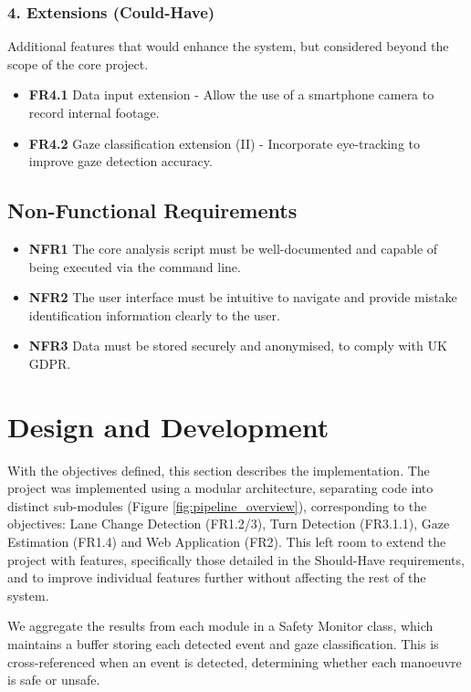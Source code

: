 \documentclass{article}
\begin{document}
\subsubsection*{4. Extensions (Could-Have)}
Additional features that would enhance the system, but considered beyond the scope of the core project.

\begin{itemize}
    \item \textbf{FR4.1} Data input extension - Allow the use of a smartphone camera to record internal footage.
    \item \textbf{FR4.2} Gaze classification extension (II) - Incorporate eye-tracking to improve gaze detection accuracy.
\end{itemize}

\subsection*{Non-Functional Requirements}
\begin{itemize}
    \item \textbf{NFR1} The core analysis script must be well-documented and capable of being executed via the command line.
    \item \textbf{NFR2} The user interface must be intuitive to navigate and provide mistake identification information clearly to the user.
    \item \textbf{NFR3} Data must be stored securely and anonymised, to comply with UK GDPR.
\end{itemize}

\newpage

\section{Design and Development}

With the objectives defined, this section describes the implementation. The project was implemented using a modular architecture, separating code into distinct sub-modules (Figure \ref{fig:pipeline_overview}), corresponding to the objectives: Lane Change Detection (FR1.2/3), Turn Detection (FR3.1.1), Gaze Estimation (FR1.4) and Web Application (FR2). This left room to extend the project with features, specifically those detailed in the Should-Have requirements, and to improve individual features further without affecting the rest of the system.

We aggregate the results from each module in a Safety Monitor class, which maintains a buffer storing each detected event and gaze classification. This is cross-referenced when an event is detected, determining whether each manoeuvre is safe or unsafe.
\end{document}
